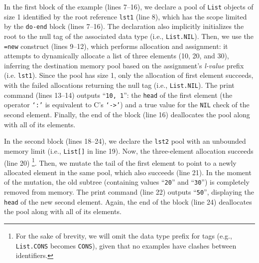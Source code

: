 \documentclass{sig-alternate}
\newcommand{\CEU}{\textsc{C\'{e}u}\xspace}
\newcommand{\code}[1] {{\small{\texttt{#1}}}}
\begin{document}

In the first block of the example (lines 7--16), we declare a pool of 
\code{List} objects of size 1 identified by the root reference \code{lst1} 
(line 8), which has the scope limited by the \code{do-end} block (lines 7--16).
The declaration also implicitly initializes the root to the null tag of the 
associated data type (i.e., \code{List.NIL}).
%
Then, we use the \code{=new} construct (lines 9--12), which performs
allocation and assignment: it attempts to dynamically allocate a list of
three elements (10, 20, and 30), inferring the destination memory pool based on 
the assignment's \emph{l-value} prefix (i.e. \code{lst1}).
%
Since the pool has size 1, only the allocation of first element succeeds, with 
the failed allocations returning the null tag (i.e., \code{List.NIL}).
The print command (lines 13--14) outputs ``\texttt{10, 1}'': the \code{head} of 
the first element (the operator \code{`:'} is equivalent to C's \code{`->'}) 
and a true value for the \code{NIL} check of the second element.
%
Finally, the end of the block (line 16) deallocates the pool along with all of 
its elements.

In the second block (lines 18--24), we declare the \code{lst2} pool with an 
unbounded memory limit (i.e., \code{List[]} in line 19).
Now, the three-element allocation succeeds (line 20)%
\footnote{For the sake of brevity, we will omit the data type prefix for tags 
(e.g., \code{List.CONS} becomes \code{CONS}), given that no examples have 
clashes between identifiers.}.
Then, we mutate the tail of the first element to point to a newly allocated 
element in the same pool, which also succeeds (line 21).
In the moment of the mutation, the old subtree (containing values  
``\texttt{20}'' and  ``\texttt{30}'') is completely removed from memory.
The print command (line 22) outputs ``\texttt{50}'', displaying the \code{head}
of the new second element.
%
Again, the end of the block (line 24) deallocates the pool along with all of 
its elements.
\end{document}

